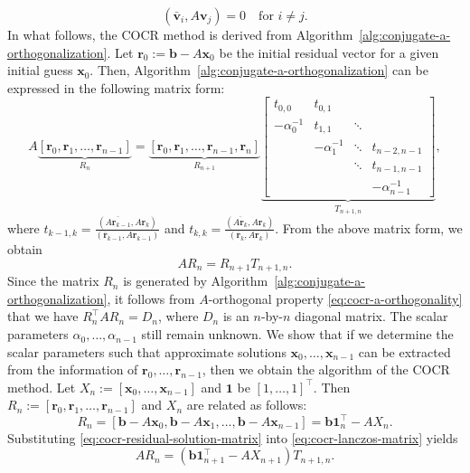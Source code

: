 \begin{equation}\label{eq:cocr-a-orthogonality}(\bar{\bm v}_i,A\bm v_j)=0\quad\text{for }i\ne j.\end{equation}
{In what follows, the COCR method is derived from Algorithm\ \ref{alg:conjugate-a-orthogonalization}. Let $\bm r_0:=\bm b-A\bm x_0$ be the initial residual vector for a given initial guess $\bm x_0$. Then, Algorithm\ \ref{alg:conjugate-a-orthogonalization} can be expressed in the following matrix form:}
\[A\underbrace{[\bm r_0,\bm r_1,\ldots,\bm r_{n-1}]}_{R_n}
=\underbrace{[\bm r_0,\bm r_1,\ldots,\bm r_{n-1},\bm r_n]}_{R_{n+1}}
\underbrace{\begin{bmatrix}t_{0,0}&t_{0,1}&&\\-\alpha_0^{-1}&t_{1,1}&\ddots&\\&-\alpha_1^{-1}&\ddots&t_{n-2,n-1}\\&&\ddots&t_{n-1,n-1}\\&&&-\alpha_{n-1}^{-1}\end{bmatrix}}_{T_{n+1,n}},\]
{where $t_{k-1,k}=\frac{(\overline{A\bm r_{k-1}},A\bm r_k)}{(\bar{\bm r}_{k-1},A\bm r_{k-1})}$ and $t_{k,k}=\frac{(\overline{A\bm r_k},A\bm r_k)}{(\bar{\bm r}_k,A\bm r_k)}$. From the above matrix form, we obtain}
\begin{equation}\label{eq:cocr-lanczos-matrix}AR_n=R_{n+1}T_{n+1,n}.\end{equation}
{Since the matrix $R_n$ is generated by Algorithm\ \ref{alg:conjugate-a-orthogonalization}, it follows from $A$-orthogonal property \eqref{eq:cocr-a-orthogonality} that we have $R_n^{\top}AR_n=D_n$, where $D_n$ is an $n$-by-$n$ diagonal matrix. The scalar parameters $\alpha_0,\ldots,\alpha_{n-1}$ still remain unknown. We show that if we determine the scalar parameters such that approximate solutions $\bm x_0,\ldots,\bm x_{n-1}$ can be extracted from the information of $\bm r_0,\ldots,\bm r_{n-1}$, then we obtain the algorithm of the COCR method.}
{Let $X_n:=[\bm x_0,\ldots,\bm x_{n-1}]$ and $\bm1$ be $[1,\ldots,1]^{\top}$. Then $R_n:=[\bm r_0,\bm r_1,\ldots,\bm r_{n-1}]$ and $X_n$ are related as follows:}
\begin{equation}\label{eq:cocr-residual-solution-matrix}R_n=[\bm b-A\bm x_0,\bm b-A\bm x_1,\ldots,\bm b-A\bm x_{n-1}]=\bm b\bm1_n^{\top}-AX_n.\end{equation}
{Substituting \eqref{eq:cocr-residual-solution-matrix} into \eqref{eq:cocr-lanczos-matrix} yields}
\[AR_n=(\bm b\bm1_{n+1}^{\top}-AX_{n+1})T_{n+1,n}.\]
